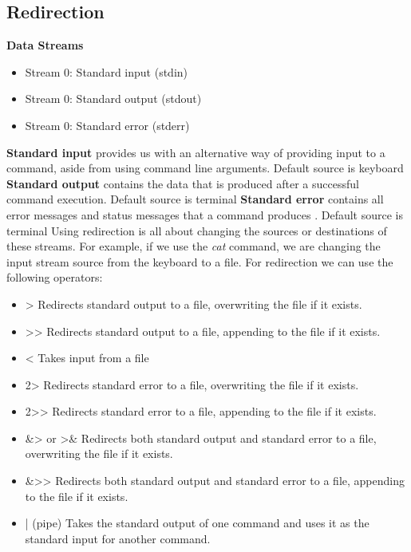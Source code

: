 \documentclass{report}
\begin{document}
  \subsection{Redirection}
  \bigbreak \noindent 
  \textbf{Data Streams}
  \begin{itemize}
      \item Stream 0: Standard input (stdin)
      \item Stream 0: Standard output (stdout)
      \item Stream 0: Standard error (stderr)
  \end{itemize}
  \bigbreak \noindent 
  \textbf{Standard input} provides us with an alternative way of providing input to a command, aside from using command line arguments. Default source is keyboard
  \bigbreak \noindent 
  \textbf{Standard output} contains the data that is produced after a successful command execution. Default source is terminal 
  \bigbreak \noindent 
  \textbf{Standard error} contains all error messages and status messages  that a command produces . Default source is terminal
  \bigbreak \noindent 
  Using redirection is all about changing the sources or destinations of these streams. For example, if we use the \textit{cat} command, we are changing the input stream source from the keyboard to a file.
  \pagebreak \bigbreak \noindent 
  For redirection we can use the following operators:
  \begin{itemize}
      \item > Redirects standard output to a file, overwriting the file if it exists.
        \item >> Redirects standard output to a file, appending to the file if it exists.
        \item < Takes input from a file
        \item 2> Redirects standard error to a file, overwriting the file if it exists.
        \item 2>> Redirects standard error to a file, appending to the file if it exists.
        \item \&> or >\& Redirects both standard output and standard error to a file, overwriting the file if it exists.
        \item \&>> Redirects both standard output and standard error to a file, appending to the file if it exists.
        \item | (pipe) Takes the standard output of one command and uses it as the standard input for another command.
  \end{itemize}
\end{document}

